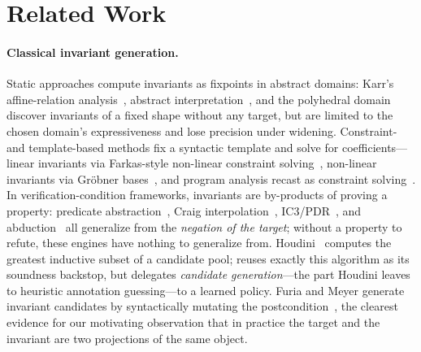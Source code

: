 \section{Related Work}\label{sec:related}

\paragraph{Classical invariant generation.}
Static approaches compute invariants as fixpoints in abstract domains: Karr's affine-relation analysis~\citep{karr1976affine}, abstract interpretation~\citep{cousot1977abstract}, and the polyhedral domain~\citep{cousot1978automatic} discover invariants of a fixed shape without any target, but are limited to the chosen domain's expressiveness and lose precision under widening.
Constraint- and template-based methods fix a syntactic template and solve for coefficients---linear invariants via Farkas-style non-linear constraint solving~\citep{colon2003linear}, non-linear invariants via Gr\"obner bases~\citep{sankaranarayanan2004non}, and program analysis recast as constraint solving~\citep{gulwani2008program,gupta2009invgen}.
In verification-condition frameworks, invariants are by-products of proving a property: predicate abstraction~\citep{graf1997predicate,ball2002slam}, Craig interpolation~\citep{mcmillan2003interpolation}, IC3/PDR~\citep{bradley2011sat,komuravelli2014smt,gurfinkel2015seahorn}, and abduction~\citep{dillig2013inductive} all generalize from the \emph{negation of the target}; without a property to refute, these engines have nothing to generalize from.
Houdini~\citep{flanagan2001houdini} computes the greatest inductive subset of a candidate pool; \sam{} reuses exactly this algorithm as its soundness backstop, but delegates \emph{candidate generation}---the part Houdini leaves to heuristic annotation guessing---to a learned policy.
Furia and Meyer generate invariant candidates by syntactically mutating the postcondition~\citep{furia2010inferring}, the clearest evidence for our motivating observation that in practice the target and the invariant are two projections of the same object.

